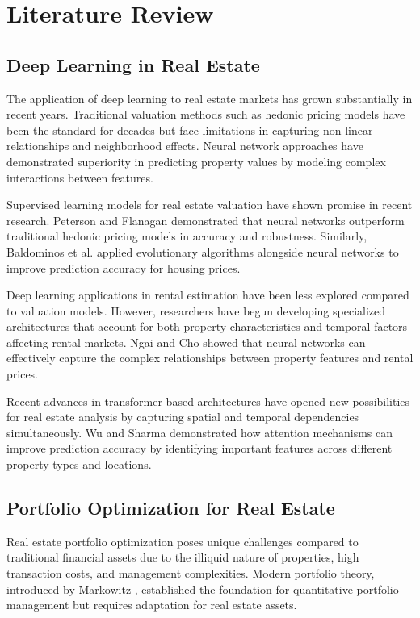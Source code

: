 \documentclass[conference]{IEEEtran}
\begin{document}
\section{Literature Review}

\subsection{Deep Learning in Real Estate}
The application of deep learning to real estate markets has grown substantially in recent years. Traditional valuation methods such as hedonic pricing models have been the standard for decades but face limitations in capturing non-linear relationships and neighborhood effects. Neural network approaches have demonstrated superiority in predicting property values by modeling complex interactions between features.

Supervised learning models for real estate valuation have shown promise in recent research. Peterson and Flanagan \cite{peterson2009neural} demonstrated that neural networks outperform traditional hedonic pricing models in accuracy and robustness. Similarly, Baldominos et al. \cite{baldominos2018identifying} applied evolutionary algorithms alongside neural networks to improve prediction accuracy for housing prices.

Deep learning applications in rental estimation have been less explored compared to valuation models. However, researchers have begun developing specialized architectures that account for both property characteristics and temporal factors affecting rental markets. Ngai and Cho \cite{ngai2011application} showed that neural networks can effectively capture the complex relationships between property features and rental prices.

Recent advances in transformer-based architectures have opened new possibilities for real estate analysis by capturing spatial and temporal dependencies simultaneously. Wu and Sharma \cite{wu2021deep} demonstrated how attention mechanisms can improve prediction accuracy by identifying important features across different property types and locations.

\subsection{Portfolio Optimization for Real Estate}
Real estate portfolio optimization poses unique challenges compared to traditional financial assets due to the illiquid nature of properties, high transaction costs, and management complexities. Modern portfolio theory, introduced by Markowitz \cite{markowitz1952portfolio}, established the foundation for quantitative portfolio management but requires adaptation for real estate assets.
\end{document}
